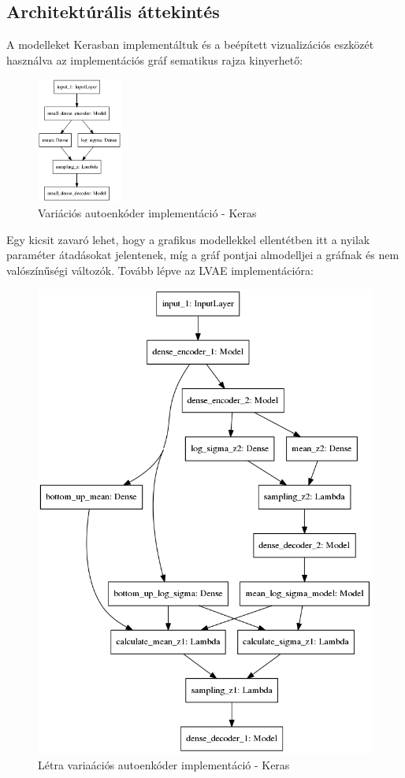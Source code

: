 \documentclass[12pt, english]{article}
\begin{document}
\subsection{Architektúrális áttekintés}

\vspace{5mm}

\par A modelleket Kerasban \cite{chollet2015keras} implementáltuk és a beépített vizualizációs eszközét használva az implementációs gráf sematikus rajza kinyerhető:

\vspace{4mm}

\begin{figure}[H]
    \centering
    \includegraphics[width=0.25\textwidth]{vae_keras.png}
    \caption{Variációs autoenkóder implementáció - Keras}
\end{figure}

\vspace{4mm}

\par Egy kicsit zavaró lehet, hogy a grafikus modellekkel ellentétben itt a nyilak paraméter átadásokat jelentenek, míg a gráf pontjai almodelljei a gráfnak és nem valószínűségi változók. Tovább lépve az LVAE implementációra:

\vspace{4mm}

\begin{figure}[H]
    \centering
    \includegraphics[width=0.6\linewidth]{dense_lvae_keras.png}
    \caption{Létra variaációs autoenkóder implementáció - Keras}
    \label{fig:keras_lvae}
\end{figure}
\end{document}
